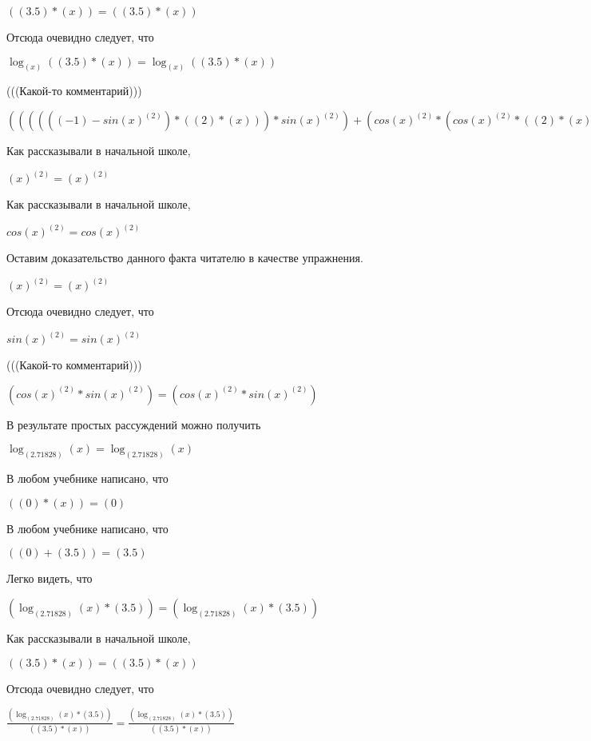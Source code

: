 \documentclass[12pt,a4paper,fleqn]{article}
\theoremstyle{definition}
\begin{document}
$(( 3.5 ) * ( x )) = (( 3.5 ) * ( x ))$

Отсюда очевидно следует, что

$\log_{( x )}{(( 3.5 ) * ( x ))} = \log_{( x )}{(( 3.5 ) * ( x ))}$

(((Какой-то комментарий)))

$(((((( -1 ) - sin{( x )}^{( 2 )}) * (( 2 ) * ( x ))) * sin{( x )}^{( 2 )}) + (cos{( x )}^{( 2 )} * (cos{( x )}^{( 2 )} * (( 2 ) * ( x ))))) * \log_{( x )}{(( 3.5 ) * ( x ))}) = (((((( -1 ) - sin{( x )}^{( 2 )}) * (( 2 ) * ( x ))) * sin{( x )}^{( 2 )}) + (cos{( x )}^{( 2 )} * (cos{( x )}^{( 2 )} * (( 2 ) * ( x ))))) * \log_{( x )}{(( 3.5 ) * ( x ))})$

Как рассказывали в начальной школе,

${( x )}^{( 2 )} = {( x )}^{( 2 )}$

Как рассказывали в начальной школе,

$cos{( x )}^{( 2 )} = cos{( x )}^{( 2 )}$

Оставим доказательство данного факта читателю в качестве упражнения.

${( x )}^{( 2 )} = {( x )}^{( 2 )}$

Отсюда очевидно следует, что

$sin{( x )}^{( 2 )} = sin{( x )}^{( 2 )}$

(((Какой-то комментарий)))

$(cos{( x )}^{( 2 )} * sin{( x )}^{( 2 )}) = (cos{( x )}^{( 2 )} * sin{( x )}^{( 2 )})$

В результате простых рассуждений можно получить

$\log_{( 2.71828 )}{( x )} = \log_{( 2.71828 )}{( x )}$

В любом учебнике написано, что

$(( 0 ) * ( x )) = ( 0 )$

В любом учебнике написано, что

$(( 0 ) + ( 3.5 )) = ( 3.5 )$

Легко видеть, что

$(\log_{( 2.71828 )}{( x )} * ( 3.5 )) = (\log_{( 2.71828 )}{( x )} * ( 3.5 ))$

Как рассказывали в начальной школе,

$(( 3.5 ) * ( x )) = (( 3.5 ) * ( x ))$

Отсюда очевидно следует, что

$\frac{(\log_{( 2.71828 )}{( x )} * ( 3.5 ))}{(( 3.5 ) * ( x ))}
 = \frac{(\log_{( 2.71828 )}{( x )} * ( 3.5 ))}{(( 3.5 ) * ( x ))}
$
\end{document}

